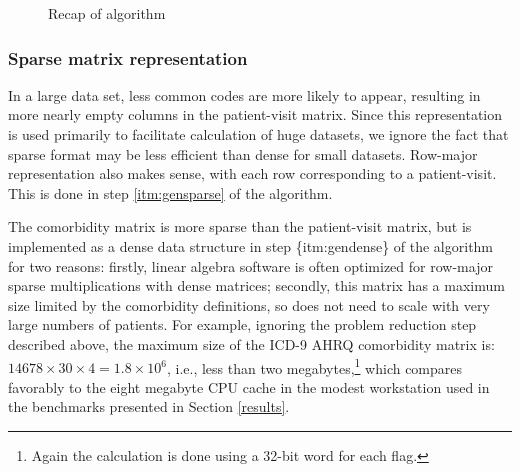 \documentclass[article]{jss}
\begin{document}
\begin{figure}[h]
\centering
\setlength{\fboxsep}{1em}
\setlength{\fboxrule}{1pt}
%
\caption{Recap of algorithm}
\label{algorecap}
\end{figure}

\subsubsection{Sparse matrix
representation}\label{sparse-matrix-representation}

In a large data set, less common codes are more likely to appear,
resulting in more nearly empty columns in the patient-visit matrix.
Since this representation is used primarily to facilitate calculation of
huge datasets, we ignore the fact that sparse format may be less
efficient than dense for small datasets. Row-major representation also
makes sense, with each row corresponding to a patient-visit. This is
done in step \ref{itm:gensparse} of the algorithm.

The comorbidity matrix is more sparse than the patient-visit matrix, but
is implemented as a dense data structure in step \{itm:gendense\} of the
algorithm for two reasons: firstly, linear algebra software is often
optimized for row-major sparse multiplications with dense matrices;
secondly, this matrix has a maximum size limited by the comorbidity
definitions, so does not need to scale with very large numbers of
patients. For example, ignoring the problem reduction step described
above, the maximum size of the ICD-9 AHRQ comorbidity matrix is:
\(14678 \times 30 \times 4 = 1.8 \times 10^6\), i.e., less than two
megabytes,\footnote{Again the calculation is done using a 32-bit word
  for each flag.} which compares favorably to the eight megabyte CPU
cache in the modest workstation used in the benchmarks presented in
Section \ref{results}.
\end{document}
